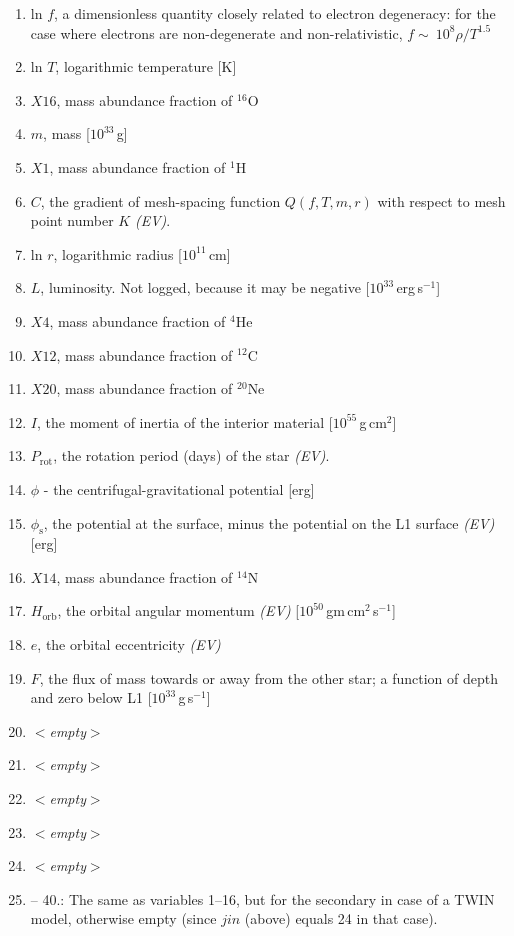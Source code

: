 \begin{enumerate}
\item ln $f$, a dimensionless quantity closely related to electron degeneracy: 
    for the case where electrons are non-degenerate and non-relativistic, $f \sim \ 10^8 \rho/T^{1.5}$ 
\item ln $T$, logarithmic temperature [K]
\item $X16$, mass abundance fraction of $^{16}$O
\item $m$, mass [$10^{33}\,$g]
\item $X1$, mass abundance fraction of $^1$H
\item $C$, the gradient of mesh-spacing function $Q(f,T,m,r)$ with respect to mesh point number $K$ \emph{(EV)}.
\item ln $r$, logarithmic radius [$10^{11}\,$cm]
\item $L$, luminosity. Not logged, because it may be negative [$10^{33}\,$erg\,s$^{-1}$]
\item $X4$, mass abundance fraction of $^4$He
\item $X12$, mass abundance fraction of $^{12}$C
\item $X20$, mass abundance fraction of $^{20}$Ne
\item $I$, the moment of inertia of the interior material  [$10^{55}\,$g\,cm$^2$]
\item $P_\mathrm{rot}$, the rotation period (days) of the star \emph{(EV)}. 
\item $\phi$ - the centrifugal-gravitational potential [erg] 
\item $\phi_\mathrm{s}$, the potential at the surface, minus the potential on the L1 surface \emph{(EV)} [erg]
\item $X14$, mass abundance fraction of $^{14}$N
\item $H_\mathrm{orb}$, the orbital angular momentum \emph{(EV)} [$10^{50}\,$gm\,cm$^2$\,s$^{-1}$]
\item $e$, the orbital eccentricity \emph{(EV)}
\item $F$, the flux of mass towards or away from the other star; a function of depth and zero below L1 [$10^{33}\,$g\,s$^{-1}$]
\item \emph{$<$empty$>$}
\item \emph{$<$empty$>$}
\item \emph{$<$empty$>$}
\item \emph{$<$empty$>$}
\item \emph{$<$empty$>$}
\item-- 40.: The same as variables 1--16, but for the secondary in case of a TWIN model, otherwise empty 
(since $jin$ (above) equals 24 in that case).
\end{enumerate}


